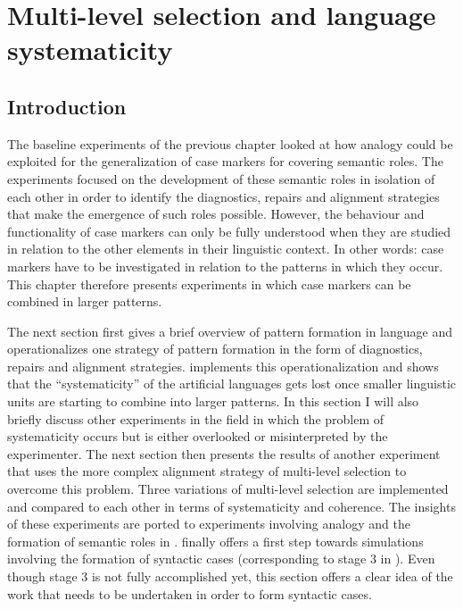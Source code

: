 
\setcounter{chapter}{3}
\chapter{Multi-level selection and language systematicity}
\label{c:experiment1}

\section{Introduction}
The baseline experiments of the previous chapter looked at how analogy could be exploited for the generalization of case markers for covering semantic roles. The experiments focused on the development of these semantic roles in isolation of each other in order to identify the diagnostics, repairs and alignment strategies that make the emergence of such roles possible. However, the behaviour and functionality of case markers can only be fully understood when they are studied in relation to the other elements in their linguistic context. In other words: case markers have to be investigated in relation to the patterns in which they occur. This chapter therefore presents experiments in which case markers can be combined in larger patterns.
 
The next section first gives a brief overview of pattern formation in language and operationalizes one strategy of pattern formation in the form of diagnostics, repairs and alignment strategies.  implements this operationalization and shows that the ``systematicity'' of the artificial languages gets lost once smaller linguistic units are starting to combine into larger patterns. In this section I will also briefly discuss other experiments in the field in which the problem of systematicity occurs but is either overlooked or misinterpreted by the experimenter. The next section then presents the results of another experiment that uses the more complex alignment strategy of multi-level selection to overcome this problem. Three variations of multi-level selection are implemented and compared to each other in terms of systematicity and coherence. The insights of these experiments are ported to experiments involving analogy and the formation of semantic roles in .  finally offers a first step towards simulations involving the formation of syntactic cases (corresponding to stage 3 in ). Even though stage 3 is not fully accomplished yet, this section offers a clear idea of the work that needs to be undertaken in order to form syntactic cases.

